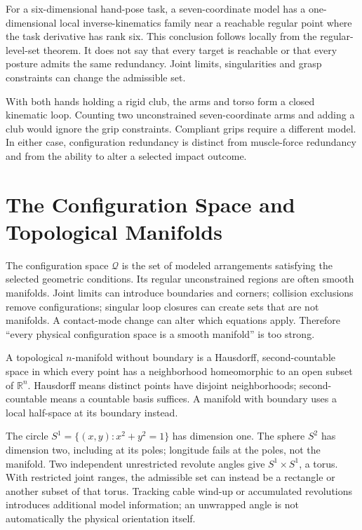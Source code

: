 For a six-dimensional hand-pose task, a seven-coordinate model has a one-dimensional local inverse-kinematics family near a reachable regular point where the task derivative has rank six. This conclusion follows locally from the regular-level-set theorem. It does not say that every target is reachable or that every posture admits the same redundancy. Joint limits, singularities and grasp constraints can change the admissible set.

With both hands holding a rigid club, the arms and torso form a closed kinematic loop. Counting two unconstrained seven-coordinate arms and adding a club would ignore the grip constraints. Compliant grips require a different model. In either case, configuration redundancy is distinct from muscle-force redundancy and from the ability to alter a selected impact outcome.

\section{The Configuration Space and Topological Manifolds}
\label{sec:config_space}
\label{laymans:config_state}
\label{ex:ex_torus}
\label{ex:ex_sphere}
\label{ex:ex_circle}
\label{def:topological_manifold}

The configuration space $\mathcal Q$ is the set of modeled arrangements satisfying the selected geometric conditions. Its regular unconstrained regions are often smooth manifolds. Joint limits can introduce boundaries and corners; collision exclusions remove configurations; singular loop closures can create sets that are not manifolds. A contact-mode change can alter which equations apply. Therefore ``every physical configuration space is a smooth manifold'' is too strong.

A topological $n$-manifold without boundary is a Hausdorff, second-countable space in which every point has a neighborhood homeomorphic to an open subset of $\mathbb R^n$. Hausdorff means distinct points have disjoint neighborhoods; second-countable means a countable basis suffices. A manifold with boundary uses a local half-space at its boundary instead.

The circle $S^1=\{(x,y):x^2+y^2=1\}$ has dimension one. The sphere $S^2$ has dimension two, including at its poles; longitude fails at the poles, not the manifold. Two independent unrestricted revolute angles give $S^1\times S^1$, a torus. With restricted joint ranges, the admissible set can instead be a rectangle or another subset of that torus. Tracking cable wind-up or accumulated revolutions introduces additional model information; an unwrapped angle is not automatically the physical orientation itself.

